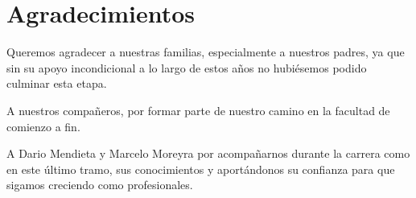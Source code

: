 \chapter*{Agradecimientos}

Queremos agradecer a nuestras familias, especialmente a nuestros padres, ya que sin su apoyo incondicional a lo largo de estos años no hubiésemos podido culminar esta etapa.

A nuestros compañeros, por formar parte de nuestro camino en la facultad de comienzo a fin.

A Dario Mendieta y Marcelo Moreyra por acompañarnos durante la carrera como en este último tramo,
sus conocimientos y aportándonos su confianza para que sigamos creciendo como profesionales.

